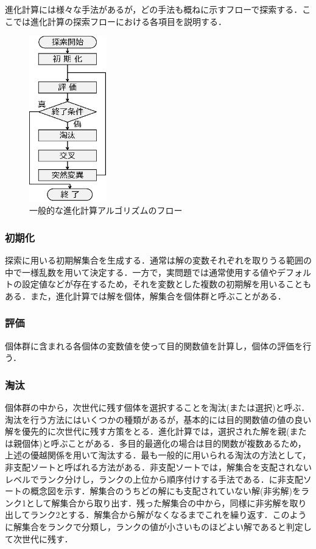 進化計算には様々な手法があるが，どの手法も概ねに示すフローで探索する．ここでは進化計算の探索フローにおける各項目を説明する．

\begin{figure}[ht]
    \begin{center}
        \includegraphics[width=0.3\textwidth,keepaspectratio=true]{fig/theory_flow.eps}
    \end{center}
    \caption{一般的な進化計算アルゴリズムのフロー}
    \label{fig::theory_flow}
\end{figure}

\subsubsection{初期化}
探索に用いる初期解集合を生成する．通常は解の変数それぞれを取りうる範囲の中で一様乱数を用いて決定する．一方で，実問題では通常使用する値やデフォルトの設定値などが存在するため，それを変数とした複数の初期解を用いることもある．また，進化計算では解を個体，解集合を個体群と呼ぶことがある．

\subsubsection{評価}
個体群に含まれる各個体の変数値を使って目的関数値を計算し，個体の評価を行う．


\subsubsection{淘汰}
個体群の中から，次世代に残す個体を選択することを淘汰(または選択)と呼ぶ．淘汰を行う方法にはいくつかの種類があるが，基本的には目的関数値の値の良い解を優先的に次世代に残す方策をとる．進化計算では，選択された解を親(または親個体)と呼ぶことがある．多目的最適化の場合は目的関数が複数あるため，上述の優越関係を用いて淘汰する．最も一般的に用いられる淘汰の方法として，非支配ソートと呼ばれる方法\cite{Deb02}がある．非支配ソートでは，解集合を支配されないレベルでランク分けし，ランクの上位から順序付けする手法である．に非支配ソートの概念図を示す．解集合のうちどの解にも支配されていない解(非劣解)をランク1として解集合から取り出す．残った解集合の中から，同様に非劣解を取り出してランク2とする．解集合から解がなくなるまでこれを繰り返す．このように解集合をランクで分類し，ランクの値が小さいものほどよい解であると判定して次世代に残す．

